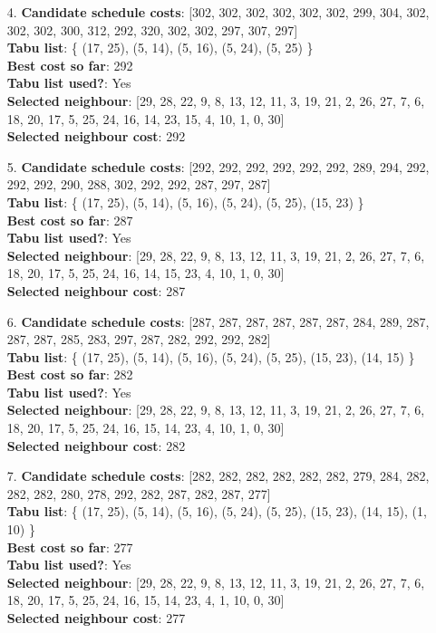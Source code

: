 \documentclass[fleqn]{article}
\begin{document}
\begin{itemize}
    \item[4.] \textbf{Candidate schedule costs}: [302, 302, 302, 302, 302, 302, 299, 304, 302, 302, 302, 300, 312, 292, 320, 302, 302, 297, 307, 297] \\
    \textbf{Tabu list}: \{ (17, 25), (5, 14), (5, 16), (5, 24), (5, 25) \} \\
    \textbf{Best cost so far}: 292 \\
    \textbf{Tabu list used?}: Yes \\
    \textbf{Selected neighbour}: [29, 28, 22, 9, 8, 13, 12, 11, 3, 19, 21, 2, 26, 27, 7, 6, 18, 20, 17, 5, 25, 24, 16, 14, 23, 15, 4, 10, 1, 0, 30] \\
    \textbf{Selected neighbour cost}: 292
      

    \item[5.] \textbf{Candidate schedule costs}: [292, 292, 292, 292, 292, 292, 289, 294, 292, 292, 292, 290, 288, 302, 292, 292, 287, 297, 287] \\
    \textbf{Tabu list}: \{ (17, 25), (5, 14), (5, 16), (5, 24), (5, 25), (15, 23) \} \\
    \textbf{Best cost so far}: 287 \\
    \textbf{Tabu list used?}: Yes \\
    \textbf{Selected neighbour}: [29, 28, 22, 9, 8, 13, 12, 11, 3, 19, 21, 2, 26, 27, 7, 6, 18, 20, 17, 5, 25, 24, 16, 14, 15, 23, 4, 10, 1, 0, 30] \\
    \textbf{Selected neighbour cost}: 287
      

    \item[6.] \textbf{Candidate schedule costs}: [287, 287, 287, 287, 287, 287, 284, 289, 287, 287, 287, 285, 283, 297, 287, 282, 292, 292, 282] \\
    \textbf{Tabu list}: \{ (17, 25), (5, 14), (5, 16), (5, 24), (5, 25), (15, 23), (14, 15) \} \\
    \textbf{Best cost so far}: 282 \\
    \textbf{Tabu list used?}: Yes \\
    \textbf{Selected neighbour}: [29, 28, 22, 9, 8, 13, 12, 11, 3, 19, 21, 2, 26, 27, 7, 6, 18, 20, 17, 5, 25, 24, 16, 15, 14, 23, 4, 10, 1, 0, 30] \\
    \textbf{Selected neighbour cost}: 282
      

    \item[7.] \textbf{Candidate schedule costs}: [282, 282, 282, 282, 282, 282, 279, 284, 282, 282, 282, 280, 278, 292, 282, 287, 282, 287, 277] \\
    \textbf{Tabu list}: \{ (17, 25), (5, 14), (5, 16), (5, 24), (5, 25), (15, 23), (14, 15), (1, 10) \} \\
    \textbf{Best cost so far}: 277 \\
    \textbf{Tabu list used?}: Yes \\
    \textbf{Selected neighbour}: [29, 28, 22, 9, 8, 13, 12, 11, 3, 19, 21, 2, 26, 27, 7, 6, 18, 20, 17, 5, 25, 24, 16, 15, 14, 23, 4, 1, 10, 0, 30] \\
    \textbf{Selected neighbour cost}: 277
      


\end{itemize}
\end{document}
